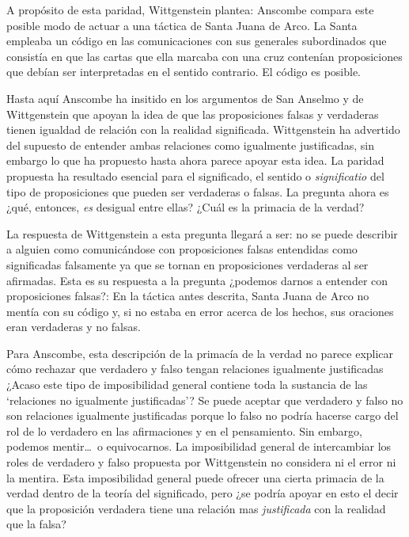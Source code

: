 A propósito de esta paridad, Wittgenstein plantea: 
Anscombe compara este posible modo de actuar a una táctica de Santa Juana de
Arco. La Santa empleaba un código en las comunicaciones con sus generales
subordinados que consistía en que las cartas que ella marcaba con una cruz
contenían proposiciones que debían ser interpretadas en el sentido contrario. El
código es posible.

Hasta aquí Anscombe ha insitido en los argumentos de San Anselmo y de
Wittgenstein que apoyan la idea de que las proposiciones falsas y verdaderas
tienen igualdad de relación con la realidad significada. Wittgenstein ha
advertido del supuesto de entender ambas relaciones como igualmente
justificadas, sin embargo lo que ha propuesto hasta ahora parece apoyar esta
idea. La paridad propuesta ha resultado esencial para el significado, el sentido
o \emph{significatio} del tipo de proposiciones que pueden ser verdaderas o
falsas. La pregunta ahora es ¿qué, entonces, \emph{es} desigual entre ellas?
¿Cuál es la primacia de la verdad?

La respuesta de Wittgenstein a esta pregunta llegará a ser: no se puede
describir a alguien como comunicándose con proposiciones falsas entendidas como
significadas falsamente ya que se tornan en proposiciones verdaderas al ser
afirmadas. Esta es su respuesta a la pregunta ¿podemos darnos a entender con
proposiciones falsas?:  En la
táctica antes descrita, Santa Juana de Arco no mentía con su código y, si no
estaba en error acerca de los hechos, sus oraciones eran verdaderas y no falsas.

Para Anscombe, esta descripción de la primacía de la verdad no parece explicar
cómo rechazar que verdadero y falso tengan relaciones igualmente justificadas
¿Acaso este tipo de imposibilidad general contiene toda la sustancia de las
`relaciones no igualmente justificadas'? Se puede aceptar que verdadero y falso
no son relaciones igualmente justificadas porque lo falso no podría hacerse
cargo del rol de lo verdadero en las afirmaciones y en el pensamiento. Sin
embargo, podemos mentir\ldots\, o equivocarnos. La imposibilidad general de
intercambiar los roles de verdadero y falso propuesta por Wittgenstein no
considera ni el error ni la mentira. Esta imposibilidad general puede ofrecer una
cierta primacia de la verdad dentro de la teoría del significado, pero ¿se
podría apoyar en esto el decir que la proposición verdadera tiene una relación
mas \emph{justificada} con la realidad que la falsa?

